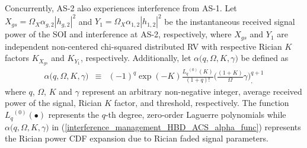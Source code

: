 Concurrently, AS-2 also experiences interference from AS-1. Let $X_{gs} = \Omega_{X}\alpha_{g,2}|h_{g,2}|^2$ and $Y_{1}=\Omega_{X}\alpha_{1,2}|h_{1,2}|^2$ be the instantaneous received signal power of the SOI and interference at AS-2, respectively, where $X_{gs}$ and $Y_{1}$ are independent non-centered chi-squared distributed RV with respective Rician $K$ factors $K_{X_{gs}}$ and $K_{Y_1}$, respectively. Additionally, let $\alpha\big(q,\Omega,K,\gamma\big)$ be defined as
\begin{eqnarray} \label{interference_management_HBD_ACS_alpha_func}
\alpha\big(q,\Omega,K,\gamma\big) & \equiv & (-1)^q \exp(-K) \frac{{L_q}^{(0)}(K)}{(1+q)!} \Bigg(\frac{(1+K)}{\Omega}\gamma\Bigg)^{q+1}_,
\end{eqnarray}
where $q$, $\Omega$, $K$ and $\gamma$ represent an arbitrary non-negative integer, average received power of the signal, Rician $K$ factor, and threshold, respectively. The function ${L_q}^{(0)}(\bullet)$ represents the $q$-th degree, zero-order Laguerre polynomials \cite{andras2011generalized} while $\alpha\big(q,\Omega,K,\gamma\big)$ in (\ref{interference_management_HBD_ACS_alpha_func}) represents the Rician power CDF expansion due to Rician faded signal parameters. 

